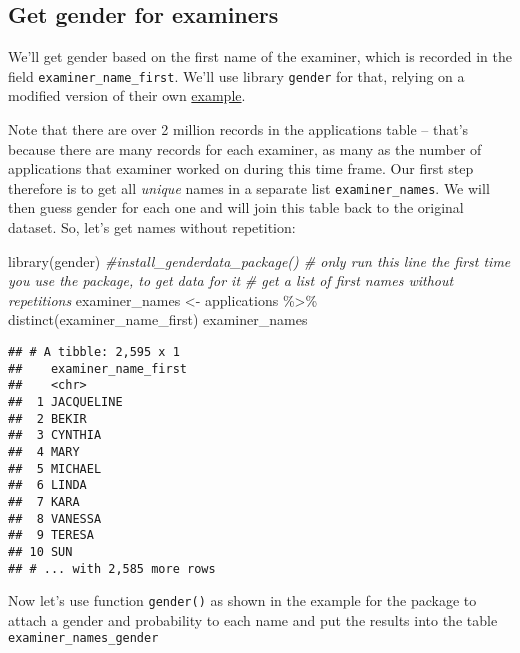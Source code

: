 \documentclass[
]{article}
\newenvironment{Shaded}{\begin{snugshade}}{\end{snugshade}}
\newcommand{\CommentTok}[1]{\textcolor[rgb]{0.56,0.35,0.01}{\textit{#1}}}
\newcommand{\FunctionTok}[1]{\textcolor[rgb]{0.00,0.00,0.00}{#1}}
\newcommand{\NormalTok}[1]{#1}
\newcommand{\OtherTok}[1]{\textcolor[rgb]{0.56,0.35,0.01}{#1}}
\newcommand{\SpecialCharTok}[1]{\textcolor[rgb]{0.00,0.00,0.00}{#1}}
\begin{document}
\hypertarget{get-gender-for-examiners}{%
\subsection{Get gender for examiners}\label{get-gender-for-examiners}}

We'll get gender based on the first name of the examiner, which is
recorded in the field \texttt{examiner\_name\_first}. We'll use library
\texttt{gender} for that, relying on a modified version of their own
\href{https://cran.r-project.org/web/packages/gender/vignettes/predicting-gender.html}{example}.

Note that there are over 2 million records in the applications table --
that's because there are many records for each examiner, as many as the
number of applications that examiner worked on during this time frame.
Our first step therefore is to get all \emph{unique} names in a separate
list \texttt{examiner\_names}. We will then guess gender for each one
and will join this table back to the original dataset. So, let's get
names without repetition:

\begin{Shaded}
\begin{Highlighting}[]
\FunctionTok{library}\NormalTok{(gender)}
\CommentTok{\#install\_genderdata\_package() \# only run this line the first time you use the package, to get data for it}
\CommentTok{\# get a list of first names without repetitions}
\NormalTok{examiner\_names }\OtherTok{\textless{}{-}}\NormalTok{ applications }\SpecialCharTok{\%\textgreater{}\%} 
  \FunctionTok{distinct}\NormalTok{(examiner\_name\_first)}
\NormalTok{examiner\_names}
\end{Highlighting}
\end{Shaded}

\begin{verbatim}
## # A tibble: 2,595 x 1
##    examiner_name_first
##    <chr>              
##  1 JACQUELINE         
##  2 BEKIR              
##  3 CYNTHIA            
##  4 MARY               
##  5 MICHAEL            
##  6 LINDA              
##  7 KARA               
##  8 VANESSA            
##  9 TERESA             
## 10 SUN                
## # ... with 2,585 more rows
\end{verbatim}

Now let's use function \texttt{gender()} as shown in the example for the
package to attach a gender and probability to each name and put the
results into the table \texttt{examiner\_names\_gender}
\end{document}
